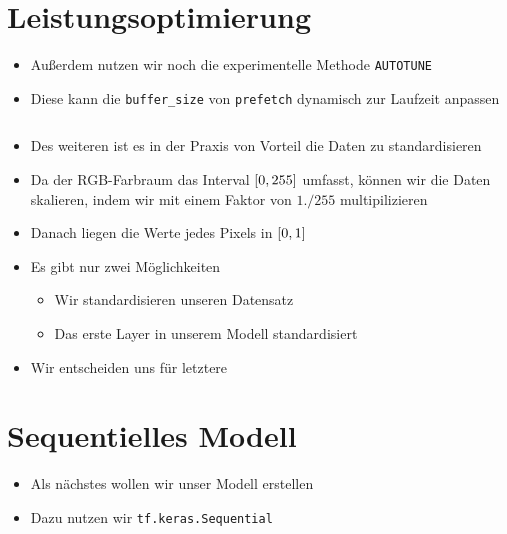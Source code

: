 \documentclass[t]{beamer}
\newcommand\pycode[1]{\inputminted[frame=lines, framesep=2mm, fontsize=\normalsize]{python}{#1}}
\begin{document}
\section{Leistungsoptimierung}
\begin{frame}
    \begin{itemize}
        \item Außerdem nutzen wir noch die experimentelle Methode \texttt{AUTOTUNE}
        \item Diese kann die \texttt{buffer\_size} von \texttt{prefetch} dynamisch zur Laufzeit anpassen
        \pycode{./code-snippets/dataset-optimize.py}
        \item Des weiteren ist es in der Praxis von Vorteil die Daten zu standardisieren
        \item Da der RGB-Farbraum das Interval \(\interval{0}{255}\) umfasst, können wir die Daten skalieren, indem wir mit einem Faktor von \(1./255\) multipilizieren
        \item Danach liegen die Werte jedes Pixels in \(\interval{0}{1}\)
        \newline  
        \item Es gibt nur zwei Möglichkeiten
        \begin{itemize}
            \item Wir standardisieren unseren Datensatz
            \item Das erste Layer in unserem Modell standardisiert
        \end{itemize}
        \item Wir entscheiden uns für letztere
    \end{itemize}
\end{frame}

\section{Sequentielles Modell}
\begin{frame}
    \begin{itemize}
        \item Als nächstes wollen wir unser Modell erstellen
        \item Dazu nutzen wir \texttt{tf.keras.Sequential}
        \pycode{./code-snippets/sequential-model-no-aug.py}
    \end{itemize}
\end{frame}
\end{document}
